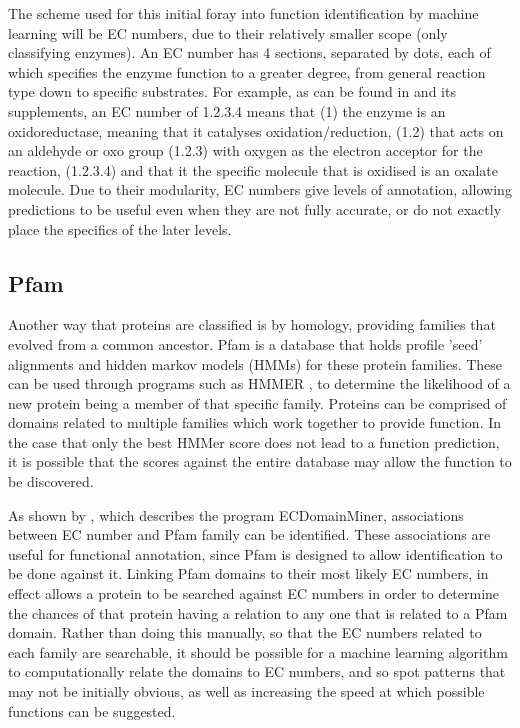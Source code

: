 \documentclass[12pt]{report}
\begin{document}
			The scheme used for this initial foray into function identification by machine learning will be EC numbers, due to their relatively smaller scope (only classifying enzymes).  An EC number has 4 sections, separated by dots, each of which specifies the enzyme function to a greater degree, from general reaction type down to specific substrates. For example, as can be found in \cite{RefWorks:doc:5d70e98ce4b0ef464262611a} and its supplements, an EC number of 1.2.3.4 means that (1) the enzyme is an oxidoreductase, meaning that it catalyses oxidation/reduction, (1.2) that acts on an aldehyde or oxo group (1.2.3) with oxygen as the electron acceptor for the reaction, (1.2.3.4) and that it the specific molecule that is oxidised is an oxalate molecule.  Due to their modularity, EC numbers give levels of annotation, allowing predictions to be useful even when they are not fully accurate, or do not exactly place the specifics of the later levels.
			
		\subsection{Pfam}

			Another way that proteins are classified is by homology, providing families that evolved from a common ancestor.  Pfam \citep{RefWorks:doc:5d6e641de4b0a51fb0eed90f} is a database that holds profile 'seed' alignments and hidden markov models (HMMs) for these protein families.  These can be used through programs such as HMMER \citep{RefWorks:doc:5c8f77ece4b077fbbf563f6a}, to determine the likelihood of a new protein being a member of that specific family. Proteins can be comprised of domains related to multiple families which work together to provide function.  In the case that only the best HMMer score does not lead to a function prediction, it is possible that the scores against the entire database may allow the function to be discovered.
					
			As shown by \cite{RefWorks:doc:5d6f9c26e4b0ec3eed182252}, which describes the program ECDomainMiner, associations between EC number and Pfam family can be identified.  These associations are useful for functional annotation, since Pfam is designed to allow identification to be done against it.  Linking Pfam domains to their most likely EC numbers, in effect allows a protein to be searched against EC numbers in order to determine the chances of that protein having a relation to any one that is related to a Pfam domain.  Rather than doing this manually, so that the EC numbers related to each family are searchable, it should be possible for a machine learning algorithm to computationally relate the domains to EC numbers, and so spot patterns that may not be initially obvious, as well as increasing the speed at which possible functions can be suggested.
			
\end{document}
